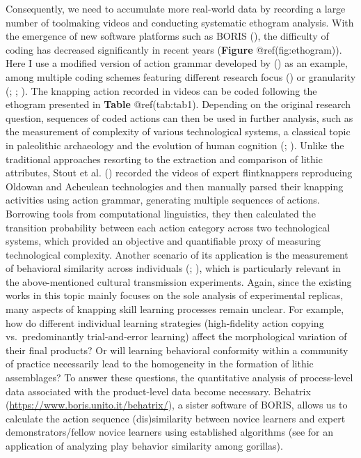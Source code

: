 \documentclass[
  11pt,
  letterpaper,
  DIV=11,
  numbers=noendperiod]{scrartcl}
\begin{document}
Consequently, we need to accumulate more real-world data by recording a
large number of toolmaking videos and conducting systematic ethogram
analysis. With the emergence of new software platforms such as BORIS
(), the difficulty of
coding has decreased significantly in recent years (\textbf{Figure}
@ref(fig:ethogram)). Here I use a modified version of action grammar
developed by () as an
example, among multiple coding schemes featuring different research
focus () or granularity
(;
; ). The knapping action recorded in videos can be coded
following the ethogram presented in \textbf{Table} @ref(tab:tab1).
Depending on the original research question, sequences of coded actions
can then be used in further analysis, such as the measurement of
complexity of various technological systems, a classical topic in
paleolithic archaeology and the evolution of human cognition
(;
). Unlike the
traditional approaches resorting to the extraction and comparison of
lithic attributes, Stout et al. ()
recorded the videos of expert flintknappers reproducing Oldowan and
Acheulean technologies and then manually parsed their knapping
activities using action grammar, generating multiple sequences of
actions. Borrowing tools from computational linguistics, they then
calculated the transition probability between each action category
across two technological systems, which provided an objective and
quantifiable proxy of measuring technological complexity. Another
scenario of its application is the measurement of behavioral similarity
across individuals (;
), which is particularly
relevant in the above-mentioned cultural transmission experiments.
Again, since the existing works in this topic mainly focuses on the sole
analysis of experimental replicas, many aspects of knapping skill
learning processes remain unclear. For example, how do different
individual learning strategies (high-fidelity action copying
vs.~predominantly trial-and-error learning) affect the morphological
variation of their final products? Or will learning behavioral
conformity within a community of practice necessarily lead to the
homogeneity in the formation of lithic assemblages? To answer these
questions, the quantitative analysis of process-level data associated
with the product-level data become necessary. Behatrix
(\url{https://www.boris.unito.it/behatrix/}), a sister software of
BORIS, allows us to calculate the action sequence (dis)similarity
between novice learners and expert demonstrators/fellow novice learners
using established algorithms (see  for an application of analyzing play behavior similarity
among gorillas).
\end{document}
